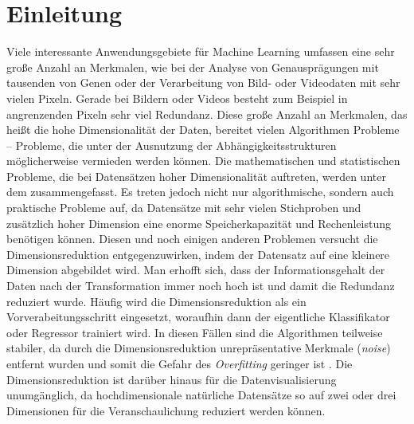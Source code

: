 \chapter{Einleitung}
\label{ch:Enleitung}

Viele interessante Anwendungsgebiete für Machine Learning umfassen eine sehr große Anzahl an
Merkmalen, wie bei der Analyse von Genausprägungen mit tausenden von Genen \parencite{Parmigiani.2003} oder der Verarbeitung von Bild- oder Videodaten mit sehr vielen Pixeln.
Gerade bei Bildern oder Videos besteht zum Beispiel in angrenzenden Pixeln sehr viel Redundanz.
Diese große Anzahl an Merkmalen, das heißt die hohe Dimensionalität der Daten, bereitet vielen
Algorithmen Probleme -- Probleme, die unter der Ausnutzung der Abhängigkeitsstrukturen
möglicherweise vermieden werden können. Die mathematischen und statistischen Probleme, die bei
Datensätzen hoher Dimensionalität auftreten, werden unter dem  \parencite{Aggarwal.2001} zusammengefasst. Es treten jedoch nicht nur algorithmische, sondern auch
praktische Probleme auf, da Datensätze mit sehr vielen Stichproben und zusätzlich hoher Dimension
eine enorme Speicherkapazität und Rechenleistung benötigen können.
Diesen und noch einigen anderen Problemen versucht die Dimensionsreduktion entgegenzuwirken, indem
der Datensatz auf eine kleinere Dimension abgebildet wird. Man erhofft sich, dass der
Informationsgehalt der Daten nach der Transformation immer noch hoch ist und damit die Redundanz
reduziert wurde. Häufig wird die Dimensionsreduktion als ein Vorverabeitungsschritt eingesetzt,
woraufhin dann der eigentliche Klassifikator oder Regressor trainiert wird. In diesen Fällen sind
die Algorithmen teilweise stabiler, da durch die Dimensionsreduktion unrepräsentative Merkmale
(\textit{noise}) entfernt wurden und somit die Gefahr des \textit{Overfitting} geringer ist \parencites[siehe]{Plastria.2008}{MustafaAbdulSalam.2021}. Die Dimensionsreduktion ist darüber hinaus
für die Datenvisualisierung unumgänglich, da hochdimensionale natürliche Datensätze so auf zwei
oder drei Dimensionen für die Veranschaulichung reduziert werden können.

